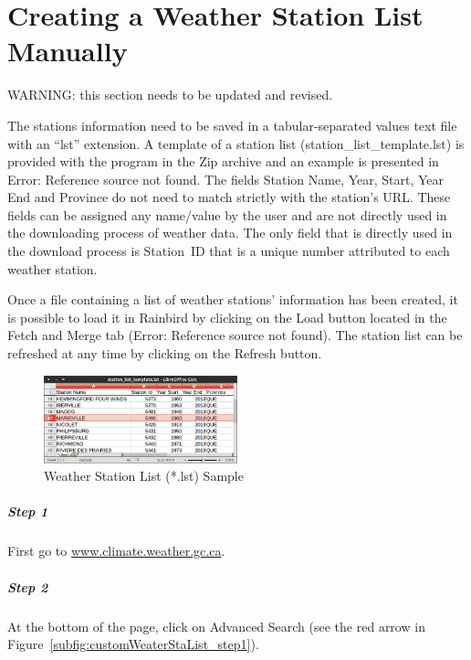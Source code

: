 \documentclass[WHATMANUAL.tex]{subfiles}
\begin{document}
\chapter{Creating a Weather Station List Manually}
\label{app:custom_station_list}

WARNING: this section needs to be updated and revised.

The stations information need to be saved in a tabular-separated values text file with an “lst” extension. A template of a station list (station\_list\_template.lst) is provided with the program in the Zip archive and an example is presented in Error: Reference source not found. The fields Station Name, Year, Start, Year End and Province do not need to match strictly with the station's URL. These fields can be assigned any name/value by the user and are not directly used in the downloading process of weather data. The only field that is directly used in the download process is Station ID that is a unique number attributed to each weather station.

Once a file containing a list of weather stations' information has been created, it is possible to load it in Rainbird by clicking on the  Load button located in the Fetch and Merge tab (Error: Reference source not found). The station list can be refreshed at any time by clicking on the  Refresh button.

\begin{figure}[h!]
\centering
\includegraphics[width=0.5\textwidth]{img/example_staList}
\caption[Weather Station List (*.lst) Sample]{Weather Station List (*.lst) Sample}
\label{fig:example_staList}
\end{figure}

\paragraph{Step 1} First go to \url{www.climate.weather.gc.ca}.

\paragraph{Step 2} At the bottom of the page, click on Advanced Search (see the red arrow in Figure~\ref{subfig:customWeaterStaList_step1}).
\end{document}
